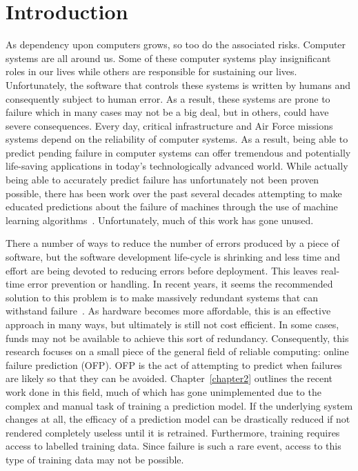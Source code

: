\chapter{Introduction} \label{chapter1}
As dependency upon computers grows, so too do the associated risks.  Computer
systems are all around us.  Some of these computer systems play insignificant
roles in our lives while others are responsible for sustaining our lives.
Unfortunately, the software that controls these systems is written by humans
and consequently subject to human error.  As a result, these systems are prone
to failure which in many cases may not be a big deal, but in others, could have
severe consequences.  Every day, critical infrastructure and Air Force missions
systems depend on the reliability of computer systems.  As a result, being able
to predict pending failure in computer systems can offer tremendous and
potentially life-saving applications in today's technologically advanced world.
While actually being able to accurately predict failure has unfortunately not
been proven possible, there has been work over the past several decades
attempting to make educated predictions about the failure of machines through
the use of machine learning algorithms~\cite{salfnerSurvey}.  Unfortunately,
much of this work has gone unused.  

There a number of ways to reduce the number of errors produced by a piece of
software, but the software development life-cycle is shrinking and less time
and effort are being devoted to reducing errors before deployment.  This leaves
real-time error prevention or handling.  In recent years, it seems the
recommended solution to this problem is to make massively redundant systems
that can withstand failure~\cite{bauer2012}.  As hardware becomes more
affordable, this is an effective approach in many ways, but ultimately is still
not cost efficient.  In some cases, funds may not be available to achieve this
sort of redundancy.  Consequently, this research focuses on a small piece of
the general field of reliable computing: online failure prediction (OFP).  OFP
is the act of attempting to predict when failures are likely so that they can
be avoided.  Chapter~\ref{chapter2} outlines the recent work done in this
field, much of which has gone unimplemented due to the complex and manual task
of training a prediction model.  If the underlying system changes at all, the
efficacy of a prediction model can be drastically reduced if not rendered
completely useless until it is retrained.  Furthermore, training requires
access to labelled training data.  Since failure is such a rare event, access
to this type of training data may not be possible.  

